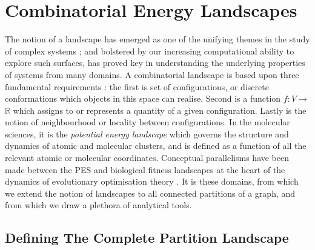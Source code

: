 \chapter{Combinatorial Energy Landscapes}
\label{chap:landscapes}

The notion of a landscape has emerged as one of the unifying themes in the study of complex systems \cite{Reidys}; and bolstered by our increasing computational ability to explore such surfaces, has proved key in understanding the underlying properties of systems from many domains.  A combinatorial landscape is based upon three fundamental requirements \cite{Reidys}: the first is set of configurations, or discrete conformations which objects in this space can realise.  Second is a function $ f:V\rightarrow  $ $ \mathbb{R} $ which assigns to or represents a quantity of a given configuration.  Lastly is the notion of neighbourhood or locality between configurations.  In the molecular sciences, it is the \textit{potential energy landscape} which governs the structure and dynamics of atomic and molecular clusters, and is defined as a function of all the relevant atomic or molecular coordinates.  Conceptual parallelisms have been made between the PES and biological fitness landscapes at the heart of the dynamics of evolutionary optimisation theory \cite{Reidys}.  It is these domains, from which we extend the notion of landscapes to all connected partitions of a graph, and from which we draw a plethora of analytical tools.

\section{Defining The Complete Partition Landscape}
\label{sec:definingTheLandscape}

